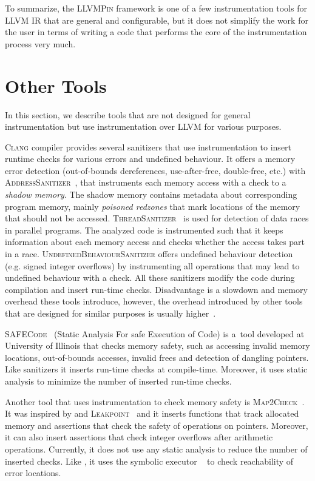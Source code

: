 To summarize, the \textsc{LLVMPin} framework is one of a few instrumentation
tools for LLVM IR that are general and configurable, but it does not simplify
the work for the user in terms of writing a code that performs the core of the
instrumentation process very much.

\section{Other Tools}

In this section, we describe tools that are not designed for general
instrumentation but use instrumentation over LLVM for various purposes.

\textsc{Clang} compiler provides several sanitizers that use instrumentation to
insert runtime checks for various errors and undefined behaviour. It offers a
memory error detection (out-of-bounds dereferences, use-after-free,
double-free, etc.) with \textsc{AddressSanitizer}~\cite{asan}, that instruments
each memory access with a check to a \textit{shadow memory}. The shadow memory
contains metadata about corresponding program memory, mainly \textit{poisoned
redzones} that mark locations of the memory that should not be accessed.
\textsc{ThreadSanitizer}~\cite{tsan} is used for detection of data races in
parallel programs. The analyzed code is instrumented such that it keeps
information about each memory access and checks whether the access takes part
in a race.  \textsc{UndefinedBehaviourSanitizer} offers undefined behaviour
detection (e.g. signed integer overflows) by instrumenting all operations that
may lead to undefined behaviour with a check. All these sanitizers modify the
code during compilation and insert run-time checks. Disadvantage is a slowdown
and memory overhead these tools introduce, however, the overhead introduced by
other tools that are designed for similar purposes is usually
higher~\cite{tsan,asan}.

\textsc{SAFECode}~\cite{safecode} (Static Analysis For safe Execution of Code)
is a~tool developed at University of Illinois that checks memory safety, such
as accessing invalid memory locations, out-of-bounds accesses, invalid frees
and detection of dangling pointers. Like \clang sanitizers it inserts run-time
checks at compile-time. Moreover, it uses static analysis to minimize the
number of inserted run-time checks.

Another tool that uses instrumentation to check memory safety is
\textsc{Map2Check}~\cite{map2check}. It was inspired by \symbiotic and
\textsc{Leakpoint}~\cite{leakpoint} and it inserts functions that track
allocated memory and assertions that check the safety of operations on
pointers.  Moreover, it can also insert assertions that check integer overflows
after arithmetic operations.  Currently, it does not use any static analysis to
reduce the number of inserted checks. Like \symbiotic, it uses the symbolic
executor \klee~\cite{klee} to check reachability of error locations.

